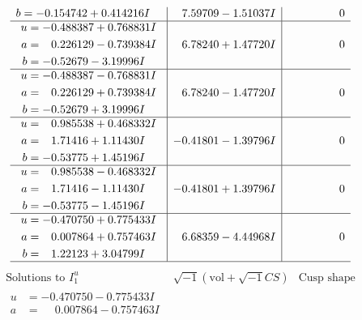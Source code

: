 \documentclass[1p]{elsarticle_modified}
\theoremstyle{definition}
\newcommand{\I}{\sqrt{-1}}
\begin{document}
$$\begin{array}{c|c|c}
\begin{aligned}
b &= -0.154742 + 0.414216 I\end{aligned}
 & \phantom{-}7.59709 - 1.51037 I & \phantom{-0.000000 } 0 \\ \hline\begin{aligned}
u &= -0.488387 + 0.768831 I \\
a &= \phantom{-}0.226129 - 0.739384 I \\
b &= -0.52679 - 3.19996 I\end{aligned}
 & \phantom{-}6.78240 + 1.47720 I & \phantom{-0.000000 } 0 \\ \hline\begin{aligned}
u &= -0.488387 - 0.768831 I \\
a &= \phantom{-}0.226129 + 0.739384 I \\
b &= -0.52679 + 3.19996 I\end{aligned}
 & \phantom{-}6.78240 - 1.47720 I & \phantom{-0.000000 } 0 \\ \hline\begin{aligned}
u &= \phantom{-}0.985538 + 0.468332 I \\
a &= \phantom{-}1.71416 + 1.11430 I \\
b &= -0.53775 + 1.45196 I\end{aligned}
 & -0.41801 - 1.39796 I & \phantom{-0.000000 } 0 \\ \hline\begin{aligned}
u &= \phantom{-}0.985538 - 0.468332 I \\
a &= \phantom{-}1.71416 - 1.11430 I \\
b &= -0.53775 - 1.45196 I\end{aligned}
 & -0.41801 + 1.39796 I & \phantom{-0.000000 } 0 \\ \hline\begin{aligned}
u &= -0.470750 + 0.775433 I \\
a &= \phantom{-}0.007864 + 0.757463 I \\
b &= \phantom{-}1.22123 + 3.04799 I\end{aligned}
 & \phantom{-}6.68359 - 4.44968 I & \phantom{-0.000000 } 0\\
 \hline 
 \end{array}$$\newpage$$\begin{array}{c|c|c}  
\text{Solutions to }I^u_{1}& \I (\text{vol} + \sqrt{-1}CS) & \text{Cusp shape}\\
 \hline 
\begin{aligned}
u &= -0.470750 - 0.775433 I \\
a &= \phantom{-}0.007864 - 0.757463 I \\

\end{aligned}
\end{array}$$
\end{document}
